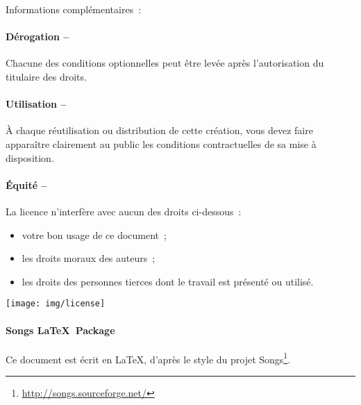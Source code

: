 {\begin{lblock}{Informations complémentaires~:}
    \hspace{0.4cm}
    \parbox{\textwidth-.8cm}{
      \paragraph{Dérogation --}
      Chacune des conditions optionnelles peut être levée après
      l'autorisation du titulaire des droits.

      \paragraph{Utilisation --}
      À chaque réutilisation ou distribution de cette création, vous
      devez faire apparaître clairement au public les conditions
      contractuelles de sa mise à disposition.

      \paragraph{Équité --}
      La licence n'interfère avec aucun des droits ci-dessous~:
      \begin{itemize}
      \item votre bon usage de ce document~;
      \item les droits moraux des auteurs~;
      \item les droits des personnes tierces dont le travail est
        présenté ou utilisé.
      \end{itemize}
    }

    \begin{center}
      \texttt{[image: img/license]}
    \end{center}

  \end{lblock}
  \paragraph{Songs \LaTeX~Package}
  Ce document est écrit en \LaTeX, d'après le style du projet
  Songs\footnote{\url{http://songs.sourceforge.net/}}.

}
